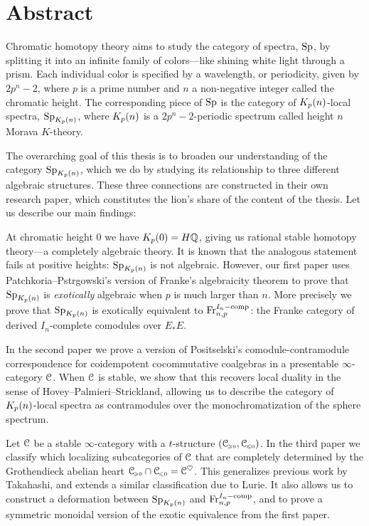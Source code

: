 

\section*{Abstract}

Chromatic homotopy theory aims to study the category of spectra, $\mathrm{Sp}$, by splitting it into an infinite family of colors---like shining white light through a prism. Each individual color is specified by a wavelength, or periodicity, given by $2p^n-2$, where $p$ is a prime number and $n$ a non-negative integer called the chromatic height. The corresponding piece of $\mathrm{Sp}$ is the category of ${K_p(n)}$-local spectra, $\mathrm{Sp}_{K_p(n)}$, where ${K_p(n)}$ is a $2p^n-2$-periodic spectrum called height $n$ Morava $K$-theory. 

The overarching goal of this thesis is to broaden our understanding of the category $\mathrm{Sp}_{K_p(n)}$, which we do by studying its relationship to three different algebraic structures. These three connections are constructed in their own research paper, which constitutes the lion's share of the content of the thesis. Let us describe our main findings:

At chromatic height $0$ we have $K_p(0) = H\mathbb{Q}$, giving us rational stable homotopy theory---a completely algebraic theory. It is known that the analogous statement fails at positive heights: $\mathrm{Sp}_{K_p(n)}$ is not algebraic. However, our first paper uses Patchkoria--Pstr\a{}gowski's version of Franke's algebraicity theorem to prove that $\mathrm{Sp}_{K_p(n)}$ is \emph{exotically} algebraic when $p$ is much larger than $n$. More precisely we prove that $\mathrm{Sp}_{K_p(n)}$ is exotically equivalent to $\mathrm{Fr}_{n,p}^{I_n-\mathrm{comp}}$: the Franke category of derived $I_n$-complete comodules over $E_*E$. 

In the second paper we prove a version of Positselski's comodule-contramodule correspondence for coidempotent cocommutative coalgebras in a presentable $\infty$-category $\EuScript{C}$. When $\EuScript{C}$ is stable, we show that this recovers local duality in the sense of Hovey--Palmieri--Strickland, allowing us to describe the category of ${K_p(n)}$-local spectra as contramodules over the monochromatization of the sphere spectrum. 

Let $\EuScript{C}$ be a stable $\infty$-category with a $t$-structure $(\EuScript{C}_{\hspace{-1pt}\scriptscriptstyle\geqslant 0}, \EuScript{C}_{\hspace{-1pt}\scriptscriptstyle\leqslant 0})$. In the third paper we classify which localizing subcategories of $\EuScript{C}$ that are completely determined by the Grothendieck abelian heart $\EuScript{C}_{\hspace{-1pt}\scriptscriptstyle\geqslant 0} \cap \EuScript{C}_{\hspace{-1pt}\scriptscriptstyle\leqslant 0} = \EuScript{C}^\heartsuit$. This generalizes previous work by Takahashi, and extends a similar classification due to Lurie. It also allows us to construct a deformation between $\mathrm{Sp}_{K_p(n)}$ and $\mathrm{Fr}_{n,p}^{I_n-\mathrm{comp}}$, and to prove a symmetric monoidal version of the exotic equivalence from the first paper. 




